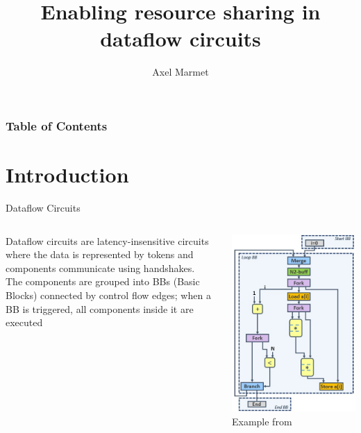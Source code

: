 \documentclass{beamer}
\title[Resource Sharing] %
{Enabling resource sharing in dataflow circuits}
\author[Marmet] %
{Axel Marmet}
\institute[EPFL] %
\date[2020] %
\begin{document}
\frame{\titlepage}


\begin{frame}
\frametitle{Table of Contents}
\tableofcontents
\end{frame}

\section{Introduction}
\begin{frame}{Dataflow Circuits}
    \begin{columns}[T]
    \begin{column}{0.45\textwidth}
        Dataflow circuits are latency-insensitive circuits where the data is represented by tokens and components communicate using handshakes. \\
       The components are grouped into BBs (Basic Blocks) connected by control flow edges; when a BB is triggered, all components inside it are executed
    \end{column}
    \begin{column}{0.45\textwidth}
        \begin{center}
      \includegraphics[scale=0.35]{datflow_example.jpg}
      Example from\footnotemark
    \end{center}
    \end{column}
  \end{columns}
\end{frame}
\end{document}
